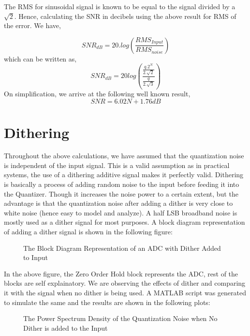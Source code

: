 \documentclass[colorlinks=true,pdfstartview=FitV,linkcolor=blue,
            citecolor=red,urlcolor=magenta]{ligodoc}
\begin{document}
The RMS for sinusoidal signal is known to be equal to the signal divided by a $\sqrt{2}$. Hence, calculating the SNR in decibels using the above result for RMS of the error. We have,

\begin{equation}
SNR_{dB} = 20.log \left(\frac{RMS_{Input}}{RMS_{noise}}\right)
\end{equation}
which can be written as,
\begin{equation}
SNR_{dB} = 20 log \left( \frac{\frac{q.2^{N}}{2.\sqrt{2}}}{\frac{q}{2.\sqrt{3}}} \right)
\end{equation}
On simplification, we arrive at the following well known result, 
\begin{equation}
SNR = 6.02 N + 1.76 dB
\end{equation}
\section{Dithering}
Throughout the above calculations, we have assumed that the quantization noise is independent of the input signal. This is a valid assumption as in practical systems, the use of a dithering additive signal makes it perfectly valid. 
Dithering is basically a process of adding random noise to the input before feeding it into the Quantizer. Though it increases the noise power to a certain extent, but the advantage is that the quantization noise after adding a dither is very close to white noise (hence easy to model and analyze). 
A half LSB broadband noise is mostly used as a dither signal for most purposes. 
A block diagram representation of adding a dither signal is shown in the following figure:
  \begin{figure}[htbp]
 
  \centering
  
  \caption{The Block Diagram Representation of an ADC with Dither Added to Input}
 
\end{figure}

In the above figure, the Zero Order Hold block represents the ADC, rest of the blocks are self explainatory. We are observing the effects of dither and comparing it with the signal when no dither is being used. A MATLAB script was generated to simulate the same and the results are shown in the following plots:
 
 \begin{figure}[htbp]
  \centering
  
  \caption{The Power Spectrum Density of the Quantization Noise when No Dither is added to the Input}
 
\end{figure}
\end{document}
